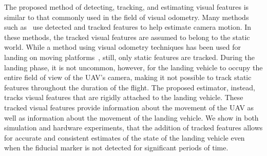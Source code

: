 The proposed method of detecting, tracking, and estimating visual features is
similar to that commonly used in the field of visual odometry. Many methods such
as~\cite{qin2018vins,leutenegger2013keyframe,mourikis2007multi,mur2015orb} use
detected and tracked features to help estimate camera motion.
In these methods, the tracked visual features are assumed to belong to the
static world. While a method using visual odometry techniques has been used for landing on
moving platforms~\cite{falanga2017vision}, still, only static features are
tracked. During the landing phase, it is not uncommon, however, for the landing vehicle
to occupy the entire field of view of the UAV's camera, making it not possible
to track static features throughout the duration of the flight.
The proposed estimator, instead, tracks
visual features that are rigidly attached to the landing vehicle. These tracked
visual features provide information about the movement of the UAV as well as
information about the movement of the landing vehicle. We show in both
simulation and hardware experiments, that the addition of tracked features allows
for accurate and consistent estimates of the state of the landing vehicle even
when the fiducial marker is not detected for significant periods of time.

